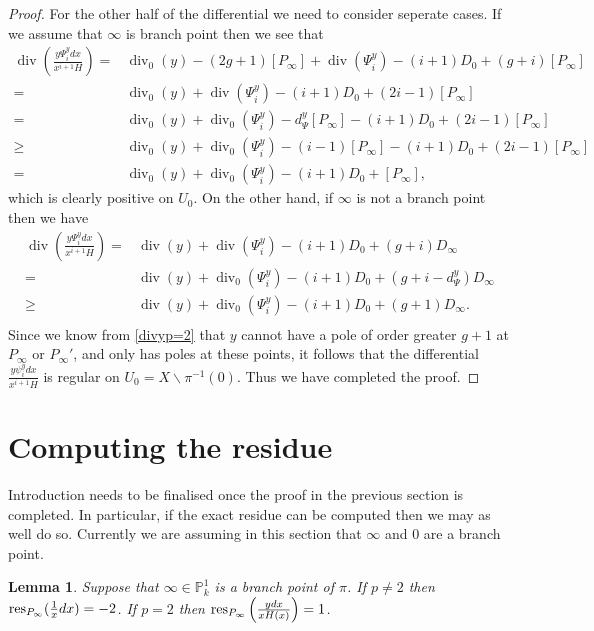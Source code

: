 \documentclass[draft, 11pt]{article} %
\theoremstyle{plain}
\newtheorem{lem}[defn]{Lemma}
\theoremstyle{remark}
\DeclareMathOperator{\di}{div}
\begin{document}
\begin{proof}
For the other half of the differential we need to consider seperate cases.
If we assume that $\infty$ is branch point then we see that
\begin{align*}
\di\left(\frac{y\Psi_i^y dx}{x^{i+1}H} \right)  =  & \di_0(y) - (2g+1)[P_\infty] + \di(\Psi_i^y) - (i+1)D_0 + (g+i)[P_\infty] \\
 =  & \di_0(y) + \di(\Psi_i^y) -(i+1)D_0 + (2i -1)[P_\infty] \\
 = &  \di_0(y) + \di_0(\Psi_i^y) - d_\Psi^y[P_\infty] - (i+1)D_0 + (2i-1)[P_\infty] \\
 \geq &  \di_0(y) + \di_0(\Psi_i^y) -(i-1)[P_\infty] -(i+1)D_0 + (2i-1)[P_\infty] \\
 =   &\di_0(y) + \di_0(\Psi_i^y) -(i+1)D_0 + [P_\infty],
\end{align*}
which is clearly positive on $U_0$.
On the other hand, if $\infty$ is not a branch point then we have
\begin{align*}
\di\left(\frac{y\Psi_i^y dx}{x^{i+1}H} \right)  =  & \di(y) + \di(\Psi_i^y) - (i+1)D_0 + (g+i)D_\infty \\
= & \di(y) + \di_0(\Psi_i^y) - (i+1)D_0 + (g+i - d_\Psi^y)D_\infty \\
\geq & \di(y) + \di_0(\Psi_i^y) - (i+1)D_0 + (g+1)D_\infty. \\
\end{align*}
Since we know from \eqref{divyp=2} that $y$ cannot have a pole of order greater $g+1$ at $P_\infty$ or $P_\infty'$, and only has poles at these points, it follows that the differential $\frac{y\psi_i^y dx}{x^{i+1}H}$ is regular on $U_0 = X \backslash \pi^{-1}(0)$.
Thus we have completed the proof.


\end{proof}

\section{Computing the residue}

Introduction needs to be finalised once the proof in the previous section is completed.
In particular, if the exact residue can be computed then we may as well do so.
Currently we are assuming in this section that $\infty$ and 0 are a branch point.

\begin{lem}
Suppose that $\infty\in \mathbb P_k^1$ is a branch point of $\pi$.
If $p \neq 2$ then ${\rm res}_{P_\infty}(\frac{1}{x}dx) = -2$.
If $p=2$ then ${\rm res}_{P_\infty}\left(\frac{ydx}{xH(x)}\right) = 1$.
\end{lem}
\end{document}
